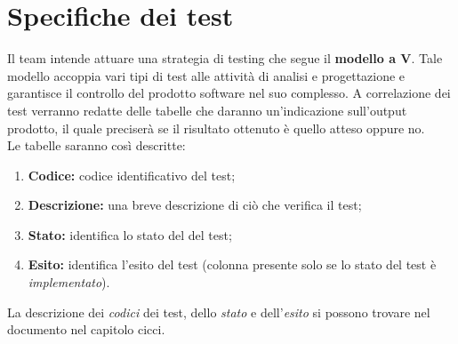 \section{Specifiche dei test}
Il team intende attuare una strategia di testing che segue il \textbf{modello a V}. Tale modello accoppia vari tipi di test alle attività di analisi e progettazione e garantisce il controllo del prodotto software nel suo complesso. A correlazione dei test verranno redatte delle tabelle che daranno un'indicazione sull'output prodotto, il quale preciserà se il risultato ottenuto è quello atteso oppure no.\\
Le tabelle saranno così descritte:
\begin{enumerate}
	\item \textbf{Codice:} codice identificativo del test;
	\item \textbf{Descrizione:} una breve descrizione di ciò che verifica il test;
	\item \textbf{Stato:} identifica lo stato del del test;
	\item \textbf{Esito:} identifica l'esito del test (colonna presente solo se lo stato del test è \textit{implementato}).
\end{enumerate}
La descrizione dei \textit{codici} dei test, dello \textit{stato} e dell'\textit{esito} si possono trovare nel documento \NdPv nel capitolo cicci.

